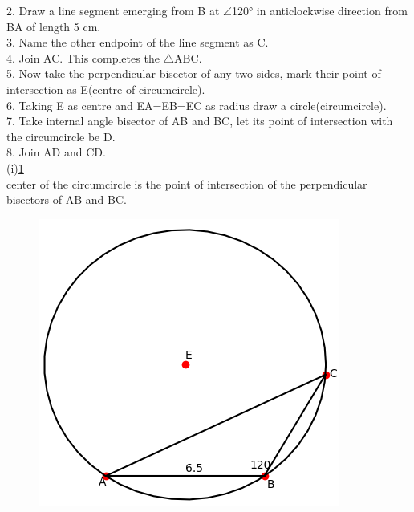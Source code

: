 \documentclass[journal,12pt,twocolumn]{IEEEtran}
\renewcommand\thesection{\arabic{section}}
\begin{document}
\begin{enumerate}[label=\thesection.\arabic*.,ref=\thesection.\theenumi]
2. Draw a line segment emerging from B at $\angle$120° in anticlockwise direction from BA of length 5 cm.\\

3. Name the other endpoint of the line segment as C.\\

4. Join AC. This completes the $\bigtriangleup$ABC.\\

5. Now take the perpendicular bisector of any two sides, mark their point of intersection as E(centre of circumcircle).\\

6. Taking E as centre and EA=EB=EC as radius draw a circle(circumcircle).\\

7. Take internal angle bisector of AB and BC, let its point of intersection with the circumcircle be D.\\

8. Join AD and CD.\\

(i)\ref{fig1} \\
center of the circumcircle is the point of intersection of the perpendicular bisectors of AB and BC.
\begin{figure}[h!]
\centering
\includegraphics[width = \columnwidth]{fig1.png}
\caption{}
\label{fig1}
\end{figure}


\end{enumerate}
\end{document}
